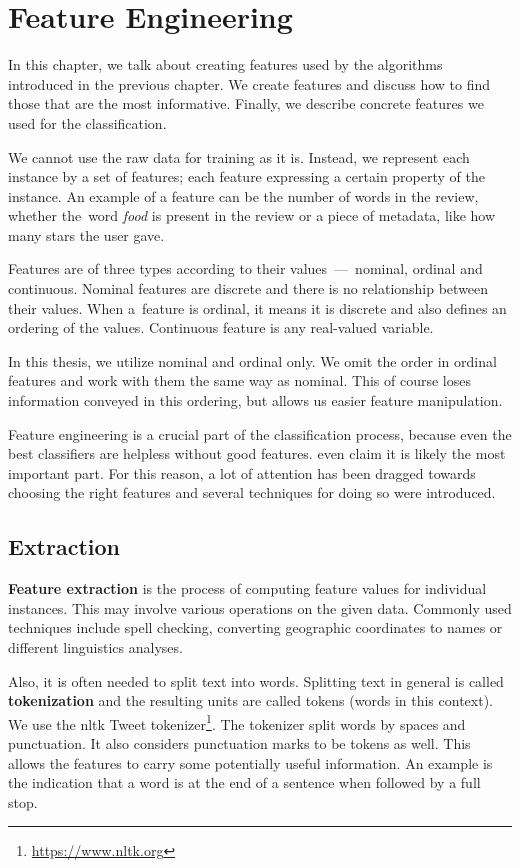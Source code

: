 \chapter{Feature Engineering} \label{chap:fea}

In this chapter, we talk about creating features used by the algorithms
introduced in the previous chapter.
We create features and discuss how to find those that are the most informative.
Finally, we describe concrete features we used for the classification.

We cannot use the raw data for training as it is.
Instead, we represent each instance by a set of features;
each feature expressing a certain property of the instance.
An example of a feature can be the number of words in the review,
whether the~word {\it food} is present in the review
or a piece of metadata, like how many stars the user gave.

Features are of three types according to their values~---~nominal, ordinal and continuous.
Nominal features are discrete and there is no relationship between their values.
When a~feature is ordinal, it means it is discrete and also defines an ordering of the values.
Continuous feature is any real-valued variable.

In this thesis, we utilize nominal and ordinal only.
We omit the order in ordinal features and work with them the same way as nominal.
This of course loses information conveyed in this ordering,
but allows us easier feature manipulation.

Feature engineering is a crucial part of the classification process,
because even the best classifiers are helpless without good features.
\citet{liu2012feature} even claim it is likely the most important part.
For this reason, a lot of attention has been dragged towards choosing the right features
and several techniques for doing so were introduced.



\section{Extraction}

\textbf{Feature extraction} is the process of computing feature values for individual instances.
This may involve various operations on the given data.
Commonly used techniques include spell checking, converting geographic coordinates to names
or different linguistics analyses.

Also, it is often needed to split text into words.
Splitting text in general is called {\bf tokenization} and
the resulting units are called tokens (words in this context).
We use the nltk Tweet tokenizer\footnote{\url{https://www.nltk.org}}.
The tokenizer split words by spaces and punctuation.
It also considers punctuation marks to be tokens as well.
This allows the features to carry some potentially useful information.
An example is the indication that a word is at the end of a sentence when followed by a full stop.

